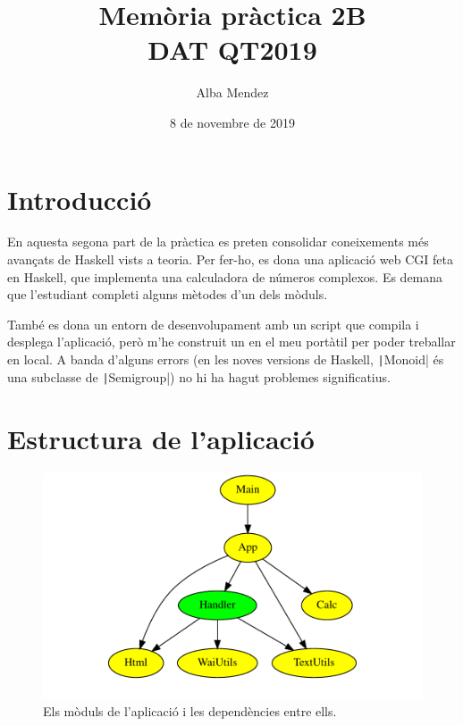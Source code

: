 \documentclass[catalan, a4paper]{scrartcl}
\author{Alba Mendez}
\title{Memòria pràctica 2B\\
{\small DAT QT2019}}
\date{8 de novembre de 2019}
\begin{document}
\maketitle


\part{Introducció}

En aquesta segona part de la pràctica es preten consolidar coneixements més
avançats de Haskell vists a teoria. Per fer-ho, es dona una aplicació web
CGI feta en Haskell, que implementa una calculadora de números complexos.
Es demana que l'estudiant completi alguns mètodes d'un dels mòduls.

També es dona un entorn de desenvolupament amb un script que compila i desplega
l'aplicació, però m'he construit un en el meu portàtil per poder treballar
en local. A banda d'alguns errors (en les noves versions de Haskell, \texttt|Monoid|
és una subclasse de \texttt|Semigroup|) no hi ha hagut problemes
significatius.

\clearpage

\part{Estructura de l'aplicació}

\begin{figure}
\centering
\includegraphics[width=\columnwidth]{deps.pdf}
\caption{\label{fig:deps} Els mòduls de l'aplicació i les dependències entre ells.}
\end{figure}
\end{document}
